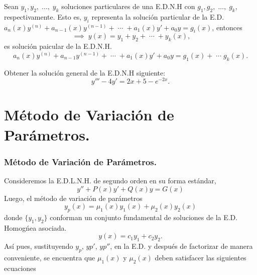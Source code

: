 \documentclass{beamer}
\begin{document}
\begin{frame}[t]
	\begin{block}{}
		Sean \(y_1,y_2, \;\ldots,\; y_k\) soluciones particulares de una E.D.N.H con \(g_1, g_2, \;\ldots,\; g_k\), respectivamente. Esto es, \(y_i\) representa la solución particular de la E.D. \(a_n(x) y^(n) + a_{n-1} (x) y^{(n-1)} + \;\cdots\; + a_1(x) y' +a_0y = g_i(x)\), entonces
		\[
			\;\implies\; y(x) = y_1+ y_2+ \;\cdots\; +y_k(x),
		\]
		es solución paicular de la E.D.N.H.
		\[
			a_n(x) y^{(n)} + a_{n-1} y^{(n-1)} + \;\cdots\; + a_1(x) y' +a_0y=g_1(x) + \;\cdots\; g_k(x).
		\]
	\end{block}
	\begin{example}
		Obtener la solución general de la E.D.N.H siguiente:
		\[
			y''' -4y' = 2x+5-e^{-2x}.
		\]
	\end{example}
\end{frame}

\section{Método de Variación de Parámetros.} %
\begin{frame}[t]
	\frametitle{Método de Variación de Parámetros.}
	\begin{block}{}
		Consideremos la E.D.L.N.H. de segundo orden en su forma estándar,
		\[
			y'' + P(x) y' +Q(x) y = G(x)
		\]
		Luego, el método de variación de parámetros
		\[
			y_p(x) = \mu _1(x) y_1(x) + \mu _2(x) y_2(x)
		\]
		donde \(\{y_1,y_2\}\) conforman un conjunto fundamental de soluciones de la E.D. Homogńea asociada.
		\[
			y(x) = c_1y_1 + c_2y_2.
		\]
		Así pues, sustituyendo \(y_p\), \(yp'\), \(yp''\), en la E.D. y después de factorizar de manera conveniente, se encuentra que \(\mu _1(x)\) y \(\mu _2(x)\) deben satisfacer las siguientes ecuaciones
	\end{block}
\end{frame}
\end{document}

